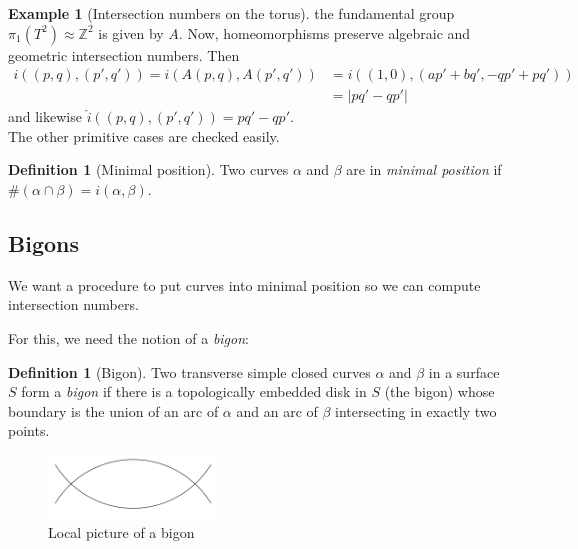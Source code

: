\documentclass[reqno]{amsart}
\theoremstyle{definition}
\newtheorem{definition}[theorem]{Definition}
\newtheorem{example}[theorem]{Example}
\theoremstyle{remark}
\begin{document}
\begin{example}[Intersection numbers on the
    torus]
    the fundamental group $\pi_1 \left( T^2 \right) 
    \approx \mathbb{Z}^2$ is given by $A$.
    Now, homeomorphisms preserve
    algebraic and 
    geometric intersection numbers.
    Then
    \begin{align*}
    i \left( \left( p,q \right) , \left( p',q' \right)  \right) 
    = i \left( A \left( p,q \right) , A\left( p',q' \right)  \right) 
    &= i \left( \left( 1,0 \right) , \left( ap'+bq',
    -qp' + pq'\right)  \right)\\
    &= \left| pq' - qp'
 \right|
    \end{align*}
    and likewise 
    $\hat{i}\left( \left( p,q \right) , \left( p',q' \right) 
    \right) = pq' - qp'$.\\
    The other primitive cases are checked easily.
\end{example}


\begin{definition}[Minimal position]
    Two curves $\alpha$ and $\beta$ are in \textit{minimal
    position} if $\# \left( \alpha \cap \beta \right) =
    i\left( \alpha, \beta \right) $.
\end{definition}

\subsection{Bigons}

We want a procedure to put curves into minimal position so
we can compute intersection numbers.

For this, we need the notion of a \textit{bigon}:

\begin{definition}[Bigon]
    Two transverse simple closed curves $\alpha$ and $\beta$ 
    in a surface $S$ form a \textit{bigon} if there is a
    topologically embedded disk in $S$ (the bigon) whose
    boundary is the union of an arc of $\alpha$ and an
    arc of  $\beta$ intersecting in exactly two points.
\end{definition}

\begin{figure}[http]
    \centering
    \includegraphics[width=0.4\textwidth]{bigon.png}
    \caption{Local picture of a bigon}
    \label{fig:bigon}
\end{figure}
\end{document}
